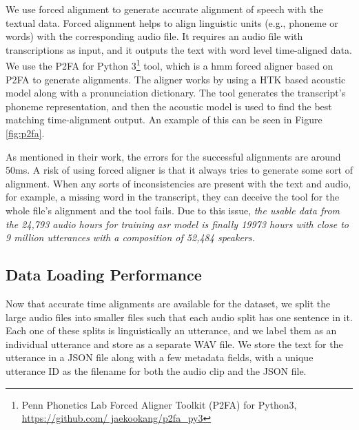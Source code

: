 We use forced alignment to generate accurate alignment of speech with the textual data. Forced alignment helps to align linguistic units (e.g., phoneme or words) with the corresponding audio file. It requires an audio file with transcriptions as input, and it outputs the text with word level time-aligned data. We use the P2FA for Python 3\footnote{Penn Phonetics Lab Forced Aligner Toolkit (P2FA) for Python3, \href{https://github.com/jaekookang/p2fa\_py3}{https://github.com/ jaekookang/p2fa\_py3}} tool, which is a \acrshort{hmm} forced aligner based on P2FA \cite{Yuan2008SPEAKERCORPUS} to generate alignments. The aligner works by using a HTK \cite{Young2002TheBook} based acoustic model along with a pronunciation dictionary. The tool generates the transcript's phoneme representation, and then the acoustic model is used to find the best matching time-alignment output. An example of this can be seen in Figure \ref{fig:p2fa}.

As mentioned in their work, the errors for the successful alignments are around 50ms. A risk of using forced aligner is that it always tries to generate some sort of alignment. When any sorts of inconsistencies are present with the text and audio, for example, a missing word in the transcript, they can deceive the tool for the whole file's alignment and the tool fails. Due to this issue, \emph{the usable data from the 24,793 audio hours for training \acrshort{asr} model is finally 19973 hours with close to 9 million utterances with a composition of 52,484 speakers.}

\subsection{Data Loading Performance}
Now that accurate time alignments are available for the dataset, we split the large audio files into smaller files such that each audio split has one sentence in it. Each one of these splits is linguistically an utterance, and we label them as an individual utterance and store as a separate WAV file. We store the text for the utterance in a JSON file along with a few metadata fields, with a unique utterance ID as the filename for both the audio clip and the JSON file. 


